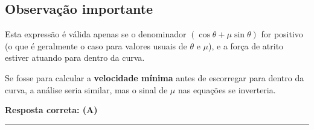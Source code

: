 \begin{flushleft}
\subsection*{Observação importante}

Esta expressão é válida apenas se o denominador \( \left( \cos\theta + \mu \sin\theta \right) \) for positivo (o que é geralmente 
o caso para valores usuais de \(\theta\) e \(\mu\)), e a força de atrito estiver atuando para dentro da curva.

Se fosse para calcular a \textbf{velocidade mínima} antes de escorregar para dentro da curva, a análise seria similar, 
mas o sinal de \(\mu\) nas equações se inverteria.

\textbf{Resposta correta: \colorbox{green!50}{(A)}}

\end{flushleft}
\noindent\rule{\linewidth}{0.6pt}\\

